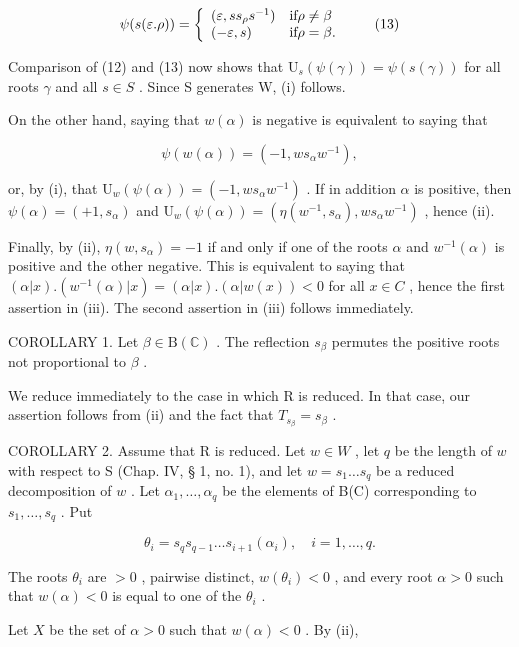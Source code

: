 \[
\psi (s (\varepsilon . \rho)) = \left\{ \begin{array}{l l} (\varepsilon , s s _ {\rho} s ^ {- 1}) & \text {if} \rho \neq \beta \\ (- \varepsilon , s) & \text {if} \rho = \beta . \end{array} \right.\tag{13}
\]

Comparison of (12) and (13) now shows that \(\mathrm{U}_{s}(\psi(\gamma)) = \psi(s(\gamma))\) for all roots \(\gamma\) and all \(s \in S\) . Since S generates W, (i) follows.

On the other hand, saying that \(w(\alpha)\) is negative is equivalent to saying that

\[
\psi (w (\alpha)) = (- 1, w s _ {\alpha} w ^ {- 1}),
\]

or, by (i), that \(\mathrm{U}_w(\psi (\alpha)) = (-1, ws_{\alpha}w^{-1})\) . If in addition \(\alpha\) is positive, then \(\psi (\alpha) = (+1,s_{\alpha})\) and \(\mathrm{U}_w(\psi (\alpha)) = (\eta (w^{-1},s_{\alpha}),ws_{\alpha}w^{-1})\) , hence (ii).

Finally, by (ii), \(\eta(w,s_{\alpha})=-1\) if and only if one of the roots \(\alpha\) and \(w^{-1}(\alpha)\) is positive and the other negative. This is equivalent to saying that \((\alpha|x).(w^{-1}(\alpha)|x)=(\alpha|x).( \alpha|w(x))<0\) for all \(x\in C\) , hence the first assertion in (iii). The second assertion in (iii) follows immediately.

COROLLARY 1. Let \(\beta \in \mathrm{B}(\mathbb{C})\) . The reflection \(s_{\beta}\) permutes the positive roots not proportional to \(\beta\) .

We reduce immediately to the case in which R is reduced. In that case, our assertion follows from (ii) and the fact that \(T_{s_{\beta}} = s_{\beta}\) .

COROLLARY 2. Assume that R is reduced. Let \(w \in W\) , let \(q\) be the length of \(w\) with respect to S (Chap. IV, § 1, no. 1), and let \(w = s_1 \ldots s_q\) be a reduced decomposition of \(w\) . Let \(\alpha_1, \ldots, \alpha_q\) be the elements of B(C) corresponding to \(s_1, \ldots, s_q\) . Put

\[
\theta_ {i} = s _ {q} s _ {q - 1} \dots s _ {i + 1} (\alpha_ {i}), \quad i = 1, \dots , q.
\]

The roots \(\theta_{i}\) are \(>0\) , pairwise distinct, \(w(\theta_{i}) < 0\) , and every root \(\alpha > 0\) such that \(w(\alpha) < 0\) is equal to one of the \(\theta_{i}\) .

Let \(X\) be the set of \(\alpha > 0\) such that \(w(\alpha) < 0\) . By (ii),


